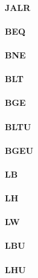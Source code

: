 \paragraph{JALR}

\paragraph{BEQ}

\paragraph{BNE}

\paragraph{BLT}

\paragraph{BGE}

\paragraph{BLTU}

\paragraph{BGEU}

\paragraph{LB}

\paragraph{LH}

\paragraph{LW}

\paragraph{LBU}

\paragraph{LHU}

